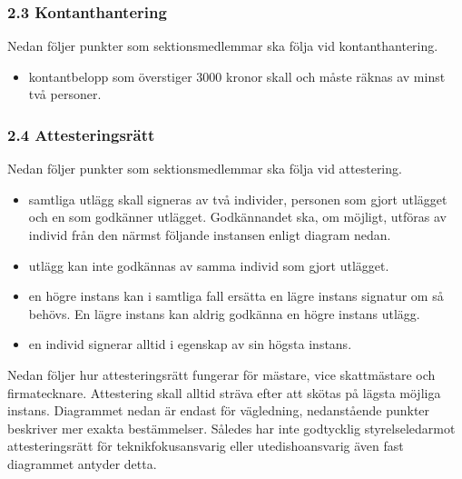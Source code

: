 \documentclass{dsekkallelse}
\begin{document}
\subsubsection{2.3 Kontanthantering}
Nedan följer punkter som sektionsmedlemmar ska följa vid kontanthantering.
\begin{itemize}
\item kontantbelopp som överstiger 3000 kronor skall och måste räknas av minst två personer.
\end{itemize}

\subsubsection{2.4 Attesteringsrätt}
Nedan följer punkter som sektionsmedlemmar ska följa vid attestering.
\begin{itemize}
\item samtliga utlägg skall signeras av två individer, personen som gjort utlägget och en som godkänner utlägget. Godkännandet ska, om möjligt, utföras av individ från den närmst följande instansen enligt diagram nedan. 
\item utlägg kan inte godkännas av samma individ som gjort utlägget.
\item en högre instans kan i samtliga fall ersätta en lägre instans signatur om så behövs. En lägre instans kan aldrig godkänna en högre instans utlägg.
\item en individ signerar alltid i egenskap av sin högsta instans.
\end{itemize}
\par Nedan följer hur attesteringsrätt fungerar för mästare, vice skattmästare och firmatecknare. Attestering skall alltid sträva efter att skötas på lägsta möjliga instans. Diagrammet nedan är endast för vägledning, nedanstående punkter beskriver mer exakta bestämmelser. Således har inte godtycklig styrelseledarmot attesteringsrätt för teknikfokusansvarig eller utedishoansvarig även fast diagrammet antyder detta.
\end{document}
